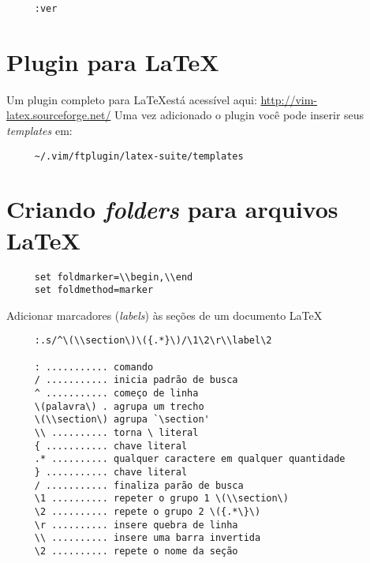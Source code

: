 \begin{verbatim}
     :ver
\end{verbatim}

\section{Plugin para \LaTeX}
\label{Plugin para LaTeX}

Um plugin completo para \LaTeX está acessível aqui:
\url{http://vim-latex.sourceforge.net/} Uma vez adicionado o plugin você pode
inserir seus {\em templates} em:

\begin{verbatim}
     ~/.vim/ftplugin/latex-suite/templates
\end{verbatim}


\section{Criando {\em folders} para arquivos \LaTeX}
\label{Criando folders para arquivos LaTeX}

\begin{verbatim}
     set foldmarker=\\begin,\\end
     set foldmethod=marker
\end{verbatim}

Adicionar marcadores ({\em labels}) às seções de um documento \LaTeX
\begin{verbatim}
     :.s/^\(\\section\)\({.*}\)/\1\2\r\\label\2
     
     : ........... comando
     / ........... inicia padrão de busca
     ^ ........... começo de linha
     \(palavra\) . agrupa um trecho
     \(\\section\) agrupa `\section'
     \\ .......... torna \ literal
     { ........... chave literal
     .* .......... qualquer caractere em qualquer quantidade
     } ........... chave literal
     / ........... finaliza parão de busca
     \1 .......... repeter o grupo 1 \(\\section\) 
     \2 .......... repete o grupo 2 \({.*\}\)
     \r .......... insere quebra de linha
     \\ .......... insere uma barra invertida
     \2 .......... repete o nome da seção
\end{verbatim}

